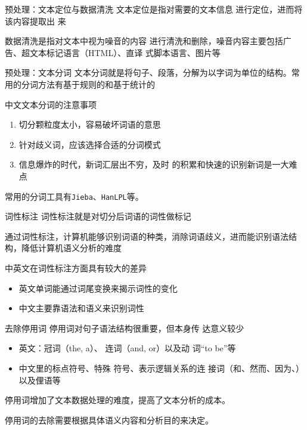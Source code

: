 \documentclass[t]{beamer}
\begin{document}
\begin{frame}[fragile]{预处理：文本定位与数据清洗}
    文本定位是指对需要的文本信息
    进行定位，进而将该内容提取出
    来

    数据清洗是指对文本中视为噪音的内容
进行清洗和删除，噪音内容主要包括广
告、超文本标记语言（HTML）、直译
式脚本语言、图片等

    
\end{frame}

\begin{frame}[fragile]{预处理：文本分词}
    文本分词就是将句子、段落，分解为以字词为单位的结构。常用的分词方法有基于规则的和基于统计的
\begin{block}{中文文本分词的注意事项}
    \begin{enumerate}
        \item 切分颗粒度太小，容易破坏词语的意思
        \item   针对歧义词，应该选择合适的分词模式
        \item 信息爆炸的时代，新词汇层出不穷，及时
        的积累和快速的识别新词是一大难点
    \end{enumerate}
\end{block}

常用的分词工具有\verb|Jieba|、\verb|HanLPL|等。
\end{frame}

\begin{frame}[fragile]{词性标注}
词性标注就是对切分后词语的词性做标记

    通过词性标注，计算机能够识别词语的种类，消除词语歧义，进而能识别语法结构，降低计算机语义分析的难度

    中英文在词性标注方面具有较大的差异
\begin{itemize}
    \item 英文单词能通过词尾变换来揭示词性的变化
    \item 中文主要靠语法和语义来识别词性
\end{itemize}
\end{frame}

\begin{frame}[fragile]{去除停用词}
    停用词对句子语法结构很重要，但本身传
    达意义较少
\begin{itemize}
    \item 英文：冠词（the, a）、
    连词（and, or）以及动
    词“to be”等
    \item 中文里的标点符号、特殊
    符号、表示逻辑关系的连
    接词（和、然而、因为、）
    以及俚语等
\end{itemize}

停用词增加了文本数据处理的难度，提高了文本分析的成本。

停用词的去除需要根据具体语义内容和分析目的来决定。
\end{frame}
\end{document}
